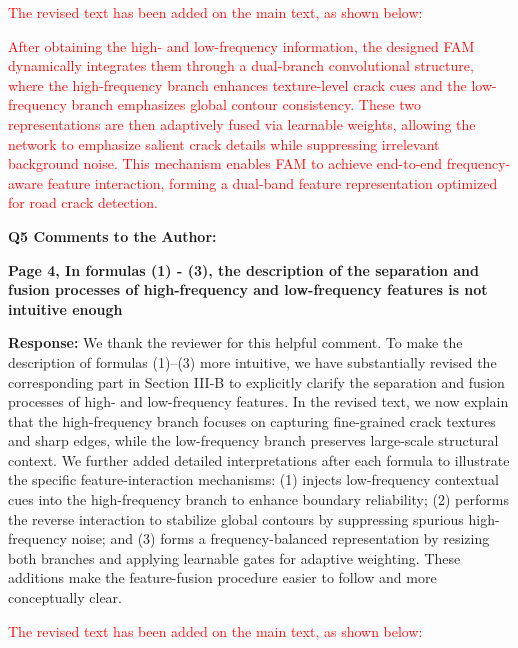 \documentclass[lettersize,journal,onecolumn,12pt]{IEEEtran}
\begin{document}
\textcolor{red}{The revised text has been added on the main text, as shown below:}

\textcolor{red}{After obtaining the high- and low-frequency information, the designed FAM dynamically integrates them through a dual-branch convolutional structure, where the high-frequency branch enhances texture-level crack cues and the low-frequency branch emphasizes global contour consistency. 
These two representations are then adaptively fused via learnable weights, allowing the network to emphasize salient crack details while suppressing irrelevant background noise. 
This mechanism enables FAM to achieve end-to-end frequency-aware feature interaction, forming a dual-band feature representation optimized for road crack detection.}\\ [10pt]




{\color{BlueGreen} \textbf{Q5 Comments to the Author:}

\textbf{Page 4, In formulas (1) - (3), the description of the separation and fusion processes of high-frequency and low-frequency features is not intuitive enough}} 

\textbf{Response:}
We thank the reviewer for this helpful comment. 
To make the description of formulas (1)–(3) more intuitive, we have substantially revised the corresponding part in Section III-B to explicitly clarify the separation and fusion processes of high- and low-frequency features. 
In the revised text, we now explain that the high-frequency branch focuses on capturing fine-grained crack textures and sharp edges, while the low-frequency branch preserves large-scale structural context. 
We further added detailed interpretations after each formula to illustrate the specific feature-interaction mechanisms: 
(1) injects low-frequency contextual cues into the high-frequency branch to enhance boundary reliability;  
(2) performs the reverse interaction to stabilize global contours by suppressing spurious high-frequency noise;  
and (3) forms a frequency-balanced representation by resizing both branches and applying learnable gates for adaptive weighting. 
These additions make the feature-fusion procedure easier to follow and more conceptually clear. 

\textcolor{red}{The revised text has been added on the main text, as shown below:}
\end{document}
